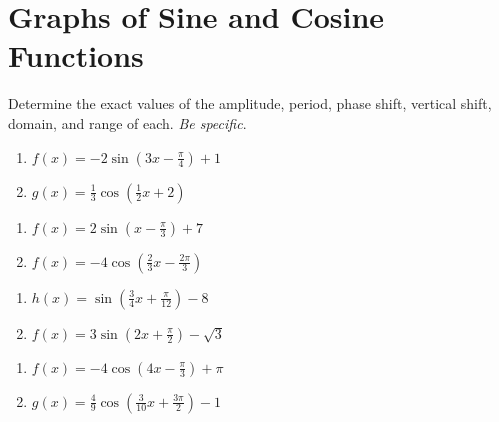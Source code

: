 \chapter{Graphs of Sine and Cosine Functions}

Determine the exact values of the amplitude, period, phase shift, vertical shift, domain, and range of each. \emph{Be specific}.

\begin{multicols}{2}
\begin{enumerate}
	\item $f(x) = -2\sin\left(3x-\frac{\pi}{4}\right) + 1$
	\item $g(x) = \frac{1}{3}\cos\left(\frac{1}{2}x + 2\right)$
\end{enumerate}	\setcounter{Review}{\value{enumi}}
\end{multicols}
\begin{multicols}{2}
\begin{enumerate}	\setcounter{enumi}{\value{Review}}
	\item $f(x)=2\sin\left(x-\frac{\pi}{3}\right)+7$
	\item $f(x)=-4\cos\left(\frac{2}{3}x-\frac{2\pi}{3}\right)$
\end{enumerate}	\setcounter{Review}{\value{enumi}}
\end{multicols}
\begin{multicols}{2}
\begin{enumerate}	\setcounter{enumi}{\value{Review}}
	\item $h(x) = \sin\left(\frac{3}{4}x + \frac{\pi}{12}\right) - 8$
	\item $f(x)=3\sin\left(2x+\frac{\pi}{2}\right)-\sqrt{3}$
\end{enumerate}	\setcounter{Review}{\value{enumi}}
\end{multicols}
\begin{multicols}{2}
\begin{enumerate}	\setcounter{enumi}{\value{Review}}
	\item $f(x) = -4\cos\left(4x-\frac{\pi}{3}\right) + \pi$
	\item $g(x) = \frac{4}{9}\cos\left(\frac{3}{10}x + \frac{3\pi}{2}\right) - 1$
\end{enumerate}
\setcounter{Review}{\value{enumi}}
\end{multicols}
\bigskip

